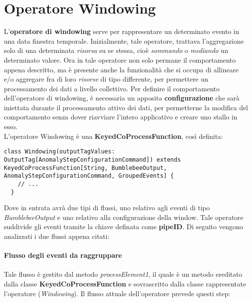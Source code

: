 \section{Operatore Windowing}
L'\textbf{operatore di windowing} serve per rappresentare un determinato evento in una data finestra temporale. Inizialmente, tale operatore, trattava l'aggregazione solo di una determinata \textit{risorsa} su se stessa, cioè \textit{sommando} o \textit{mediando} un determinato valore. Ora in tale operatore non solo permane il comportamento appena descritto, ma è presente anche la funzionalità che si occupa di allineare e/o aggregare fra di loro \textit{risorse} di tipo differente, per permettere un processamento dei dati a livello collettivo. Per definire il comportamento dell'operatore di windowing, è necessaria un apposita \textbf{configurazione} che sarà iniettata durante il processamento attivo dei dati, per permetterne la modifica del comportamento senza dover riavviare l'intero applicativo e creare uno stallo in esso.\\
L'operatore Windowing è una \textbf{KeyedCoProcessFunction}, così definita:
\begin{verbatim}
class Windowing(outputTagValues: OutputTag[AnomalyStepConfigurationCommand]) extends KeyedCoProcessFunction[String, BumblebeeOutput, AnomalyStepConfigurationCommand, GroupedEvents] {
	// ...
  }
\end{verbatim}
Dove in entrata avrà due tipi di flussi, uno relativo agli eventi di tipo \textit{BumblebeeOutput} e uno relativo alla configurazione della window. Tale operatore suddivide gli eventi tramite la chiave definata come \textbf{pipeID}. Di seguito vengono analizzati i due flussi appena citati:
\\ \\
\textbf{Flusso degli eventi da raggruppare}
\\ \\
Tale flusso è gestito dal metodo \textit{processElement1}, il quale è un metodo ereditato dalla classe \textbf{KeyedCoProcessFunction} e sovrascritto dalla classe rappresentate l'operatore (\textit{Windowing}). Il flusso attuale dell'operatore prevede questi step:

